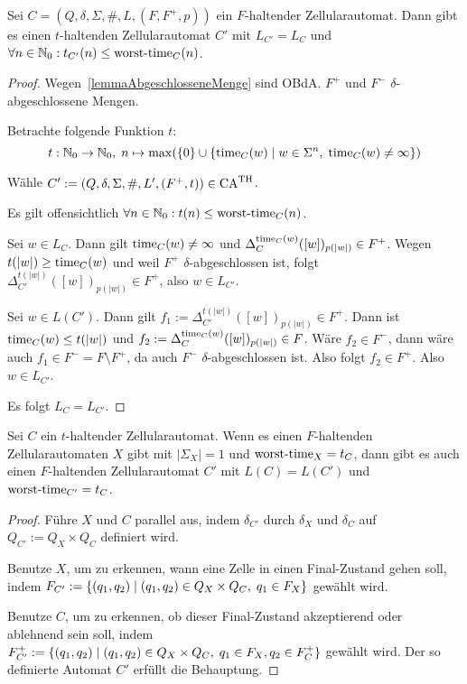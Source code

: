 \begin{satz}
    Sei $C = (Q, \delta, \Sigma, \#, L, (F, F^+, p))$ ein $F$-haltender Zellularautomat.
    Dann gibt es einen $t$-haltenden Zellularautomat $C'$ mit $L_{C'} = L_C$ und $\forall n \in \mathbb{N}_0: t_{C'}(n) \leq \operatorname{worst-time}_C(n)$.
\end{satz}
\begin{proof}
    Wegen~\cref{lemmaAbgeschlosseneMenge} sind \acs{OBdA.} $F^+$ und $F^-$ $\delta$-abgeschlossene Mengen.
    
    Betrachte folgende Funktion $t$:
    \[
        t: \mathbb{N}_0 \to \mathbb{N}_0, \; n \mapsto \max(\{ { 0 } \} \cup \{ { \operatorname{time}_C(w) } \; | \; { w \in \Sigma^n, \; \operatorname{time}_C(w) \neq \infty } \})
    \]
    
    Wähle $C' := (Q, \delta, \Sigma, \#, L', (F^+, t)) \in \textrm{CA}^{\textrm{TH}}$.
    
    Es gilt offensichtlich $\forall n \in \mathbb{N}_0: t(n) \leq \operatorname{worst-time}_C(n)$.
    
    Sei $w \in L_C$. Dann gilt $\operatorname{time}_C(w) \neq \infty$ und $\Delta_{C}^{\operatorname{time}_C(w)}([w])_{p(|w|)} \in F^+$.
    Wegen $t(|w|) \geq \operatorname{time}_C(w)$ und weil $F^+$ $\delta$-abgeschlossen ist, folgt $\Delta_{C'}^{t(|w|)}([w])_{p(|w|)} \in F^+$,
    also $w \in L_{C'}$.
    
    Sei $w \in L(C')$. Dann gilt $f_1 := \Delta_{C'}^{t(|w|)}([w])_{p(|w|)} \in F^+$. Dann ist $\operatorname{time}_C(w) \leq t(|w|)$
    und $f_2 := \Delta_{C}^{\operatorname{time}_C(w)}([w])_{p(|w|)} \in F$.
    Wäre $f_2 \in F^-$, dann wäre auch $f_1 \in F^- = F \setminus F^+$, da auch $F^-$ $\delta$-abgeschlossen ist.
    Also folgt $f_2 \in F^+$. Also $w \in L_{C'}$.
    
    Es folgt $L_C = L_{C'}$.
    
\end{proof}

\begin{satz}
    Sei $C$ ein $t$-haltender Zellularautomat.
    Wenn es einen $F$-haltenden Zellularautomaten $X$ gibt
    mit $|\Sigma_X| = 1$ und $\operatorname{worst-time}_X = t_C$,
    dann gibt es auch einen $F$-haltenden Zellularautomat $C'$ mit $L(C) = L(C')$ und $\operatorname{worst-time}_{C'} = t_C$.
\end{satz}
\begin{proof}
    Führe $X$ und $C$ parallel aus, indem $\delta_{C'}$ durch $\delta_X$ und $\delta_C$ auf $Q_{C'} := Q_X \times Q_C$ definiert wird.
    
    Benutze $X$, um zu erkennen, wann eine Zelle in einen Final-Zustand gehen soll,
    indem $F_{C'} := \{ { (q_1, q_2) } \; | \; { (q_1, q_2) \in Q_X \times Q_C, \; q_1 \in F_X } \} $ gewählt wird.
    
    Benutze $C$, um zu erkennen, ob dieser Final-Zustand akzeptierend oder ablehnend sein soll,
    indem $F_{C'}^+ := \{ { (q_1, q_2) } \; | \; { (q_1, q_2) \in Q_X \times Q_C, \; q_1 \in F_X, q_2 \in F_C^+} \} $ gewählt wird.
    Der so definierte Automat $C'$ erfüllt die Behauptung.
\end{proof}


